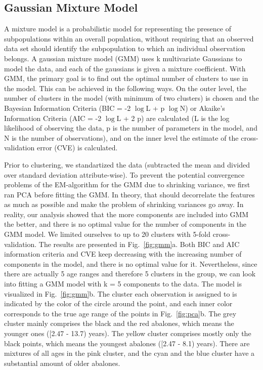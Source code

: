 \documentclass[10pt, paper=a4]{article}
\begin{document}
\subsection{Gaussian Mixture Model}
A mixture model is a probabilistic model for representing the presence of
subpopulations within an overall population, without requiring that an observed
data set should identify the subpopulation to which an individual observation
belongs.  A gaussian mixture model (GMM) uses k multivariate Gaussians to model
the data, and each of the gaussians is given a mixture coefficient.  With GMM,
the primary goal is to find out the optimal number of clusters to use in the
model.  This can be achieved in the following ways.  On the outer level, the
number of clusters in the model (with minimum of two clusters) is chosen and the
Bayesian Information Criteria (BIC = -2 $\log$L + p $\log$N) or Akaike's
Information Criteria (AIC = -2 $\log$L + 2 p) are calculated (L is the log
likelihood of observing the data, p is the number of parameters in the model,
and N is the number of observations), and on the inner level the estimate of the
cross-validation error (CVE) is calculated.

Prior to clustering, we standartized the data (subtracted the mean and divided
over standard deviation attribute-wise).  To prevent the potential convergence
problems of the EM-algorithm for the GMM due to shrinking variance, we first ran
PCA before fitting the GMM.  In theory, that should decorrelate the features as
much as possible and make the problem of shrinking variances go away.  In
reality, our analysis showed that the more components are included into GMM the
better, and there is no optimal value for the number of components in the GMM
model.  We limited ourselves to up to 20 clusters with 5-fold cross-validation.
The results are presented in Fig.~\ref{fig:gmm}a.  Both BIC and AIC information
criteria and CVE keep decreasing with the increasing number of components in the
model, and there is no optimal value for it.  Nevertheless, since there are
actually 5 age ranges and therefore 5 clusters in the group, we can look into
fitting a GMM model with k = 5 components to the data.  The model is visualized
in Fig.~\ref{fig:gmm}b.  The cluster each observation is assigned to is
indicated by the color of the circle around the point, and each inner color
corresponds to the true age range of the points in Fig.~\ref{fig:pca}b.  The
grey cluster mainly comprises the black and the red abalones, which means the
younger ones ([2.47 - 13.7) years).  The yellow cluster comprises mostly only
  the black points, which means the youngest abalones ([2.47 - 8.1) years).
    There are mixtures of all ages in the pink cluster, and the cyan and the
    blue cluster have a substantial amount of older abalones.
\end{document}
